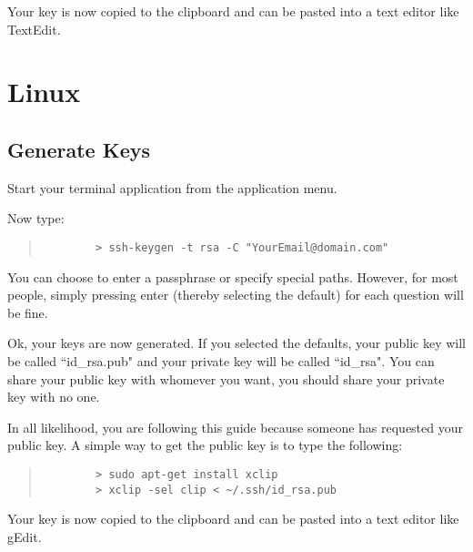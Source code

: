 \documentclass[11pt]{article}
\begin{document}
Your key is now copied to the clipboard and can be pasted into a text editor like TextEdit.

\section{Linux}

\subsection{Generate Keys}

Start your terminal application from the application menu.

Now type:

\begin{quote}
	\begin{verbatim}
		> ssh-keygen -t rsa -C "YourEmail@domain.com"
	\end{verbatim}
\end{quote}

You can choose to enter a passphrase or specify special paths.  However, for most people, simply pressing enter (thereby selecting the default) for each question will be fine.

Ok, your keys are now generated.  If you selected the defaults, your public key will be called ``id\_rsa.pub" and your private key will be called ``id\_rsa".  You can share your public key with whomever you want, you should share your private key with no one.

In all likelihood, you are following this guide because someone has requested your public key.  A simple way to get the public key is to type the following:

\begin{quote}
	\begin{verbatim}
		> sudo apt-get install xclip
		> xclip -sel clip < ~/.ssh/id_rsa.pub
	\end{verbatim}
\end{quote}

Your key is now copied to the clipboard and can be pasted into a text editor like gEdit.
\end{document}
